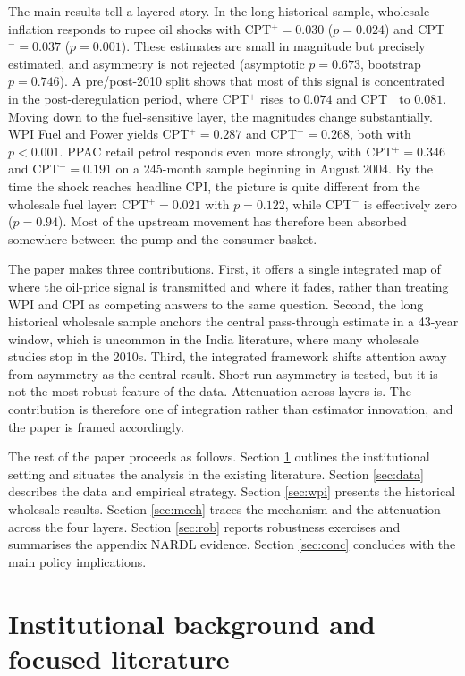 \documentclass[11pt,a4paper]{article}
\begin{document}
The main results tell a layered story. In the long historical sample, wholesale inflation responds to rupee oil shocks with CPT$^+ = 0.030$ ($p = 0.024$) and CPT$^- = 0.037$ ($p = 0.001$). These estimates are small in magnitude but precisely estimated, and asymmetry is not rejected (asymptotic $p = 0.673$, bootstrap $p = 0.746$). A pre/post-2010 split shows that most of this signal is concentrated in the post-deregulation period, where CPT$^+$ rises to $0.074$ and CPT$^-$ to $0.081$. Moving down to the fuel-sensitive layer, the magnitudes change substantially. WPI Fuel and Power yields CPT$^+ = 0.287$ and CPT$^- = 0.268$, both with $p < 0.001$. PPAC retail petrol responds even more strongly, with CPT$^+ = 0.346$ and CPT$^- = 0.191$ on a 245-month sample beginning in August 2004. By the time the shock reaches headline CPI, the picture is quite different from the wholesale fuel layer: CPT$^+ = 0.021$ with $p = 0.122$, while CPT$^- $ is effectively zero ($p = 0.94$). Most of the upstream movement has therefore been absorbed somewhere between the pump and the consumer basket.

The paper makes three contributions. First, it offers a single integrated map of where the oil-price signal is transmitted and where it fades, rather than treating WPI and CPI as competing answers to the same question. Second, the long historical wholesale sample anchors the central pass-through estimate in a 43-year window, which is uncommon in the India literature, where many wholesale studies stop in the 2010s. Third, the integrated framework shifts attention away from asymmetry as the central result. Short-run asymmetry is tested, but it is not the most robust feature of the data. Attenuation across layers is. The contribution is therefore one of integration rather than estimator innovation, and the paper is framed accordingly.

The rest of the paper proceeds as follows. Section \ref{sec:back} outlines the institutional setting and situates the analysis in the existing literature. Section \ref{sec:data} describes the data and empirical strategy. Section \ref{sec:wpi} presents the historical wholesale results. Section \ref{sec:mech} traces the mechanism and the attenuation across the four layers. Section \ref{sec:rob} reports robustness exercises and summarises the appendix NARDL evidence. Section \ref{sec:conc} concludes with the main policy implications.

\section{Institutional background and focused literature}
\label{sec:back}
\end{document}
